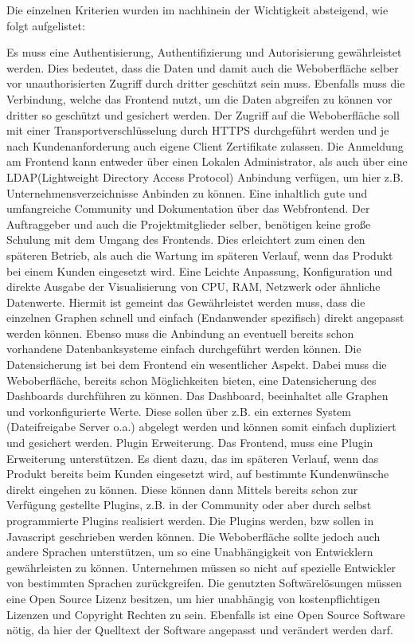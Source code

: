 Die einzelnen Kriterien wurden im nachhinein der Wichtigkeit absteigend,
wie folgt aufgelistet:
\begin{outline}
  \1 Es muss eine Authentisierung, Authentifizierung und Autorisierung
  gewährleistet werden. Dies bedeutet, dass die Daten und damit auch die
  Weboberfläche selber vor unauthorisierten Zugriff durch dritter geschützt
  sein muss. Ebenfalls muss die Verbindung, welche das Frontend nutzt, um die
  Daten abgreifen zu können vor dritter so geschützt und gesichert werden. Der
  Zugriff auf die Weboberfläche soll mit einer Transportverschlüsselung durch
  HTTPS durchgeführt werden und je nach Kundenanforderung auch eigene Client
  Zertifikate zulassen. Die Anmeldung am Frontend kann entweder über einen
  Lokalen Administrator, als auch über eine LDAP(Lightweight Directory Access
  Protocol) Anbindung verfügen, um hier z.B. Unternehmensverzeichnisse
  Anbinden zu können.
  \1 Eine inhaltlich gute und umfangreiche Community und Dokumentation über das
  Webfrontend. Der Auftraggeber und auch die Projektmitglieder selber,
  benötigen keine große Schulung mit dem Umgang des Frontends. Dies erleichtert
  zum einen den späteren Betrieb, als auch die Wartung im späteren Verlauf,
  wenn das Produkt bei einem Kunden eingesetzt wird.
  \1 Eine Leichte Anpassung, Konfiguration und direkte Ausgabe der
  Visualisierung von CPU, RAM, Netzwerk oder ähnliche Datenwerte. Hiermit ist
  gemeint das Gewährleistet werden muss, dass  die einzelnen Graphen schnell
  und einfach (Endanwender spezifisch) direkt angepasst werden können.  Ebenso
  muss die Anbindung an eventuell bereits schon vorhandene Datenbanksysteme
  einfach durchgeführt werden können.
  \1 Die Datensicherung ist bei dem Frontend ein wesentlicher Aspekt.  Dabei
  muss die Weboberfläche, bereits schon Möglichkeiten bieten, eine
  Datensicherung des Dashboards durchführen zu können.  Das Dashboard,
  beeinhaltet alle Graphen und vorkonfigurierte Werte. Diese sollen über z.B.
  ein externes System (Dateifreigabe Server o.a.) abgelegt werden und können
  somit einfach dupliziert und gesichert werden.
  \1 Plugin Erweiterung. Das Frontend, muss eine Plugin Erweiterung
  unterstützen. Es dient dazu, das im späteren Verlauf, wenn das Produkt
  bereits beim Kunden eingesetzt wird, auf bestimmte Kundenwünsche direkt
  eingehen zu können. Diese können dann Mittels bereits schon zur Verfügung
  gestellte Plugins, z.B. in der Community oder aber durch selbst programmierte
  Plugins realisiert werden. Die Plugins werden, bzw sollen in Javascript
  geschrieben werden können. Die Weboberfläche sollte jedoch auch andere
  Sprachen unterstützen, um so eine Unabhängigkeit von Entwicklern
  gewährleisten zu können. Unternehmen müssen so nicht auf spezielle
  Entwickler von bestimmten Sprachen zurückgreifen.
  \1 Die genutzten Softwärelösungen müssen eine Open Source Lizenz besitzen, um
  hier unabhängig von kostenpflichtigen Lizenzen und Copyright Rechten zu sein.
  Ebenfalls ist eine Open Source Software nötig, da hier der Quelltext der
  Software angepasst und verändert werden darf.
\end{outline}
\mr%

